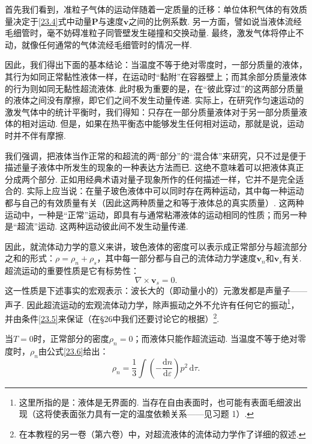 首先我们看到，准粒子气体的运动伴随着一定质量的迁移：单位体积气体的有效质量决定于\eqref{23.4}式中动量$\bm{P}$与速度$\bm{v}$之间的比例系数. 另一方面，譬如说当液体流经毛细管时，毫不妨碍准粒子同管壁发生碰撞和交换动量. 最终，激发气体将停止不动，就像任何通常的气体流经毛细管时的情况一样.

因此，我们得出下面的基本结论：当温度不等于绝对零度时，一部分质量的液体，其行为如同正常黏性液体一样，在运动时“黏附”在容器壁上；而其余部分质量液体的行为则如同无黏性超流液体. 此时极为重要的是，在“彼此穿过”的这两部分质量的液体之间没有摩擦，即它们之间不发生动量传递. 实际上，在研究作匀速运动的激发气体中的统计平衡时，我们得知：只存在一部分质量液体对于另一部分质量液体的相对运动. 但是，如果在热平衡态中能够发生任何相对运动，那就是说，运动时并不伴有摩擦.

我们强调，把液体当作正常的和超流的两“部分”的“混合体”来研究，只不过是便于描述量子液体中所发生的现象的一种表达方法而已. 这绝不意味着可以把液体真正分成两个部分. 正如用经典术语对量子现象所作的任何描述一样，它并不是完全适合的. 实际上应当说：在量子玻色液体中可以同时存在两种运动，其中每一种运动都与自己的有效质量有关（因此这两种质量之和等于液体总的真实质量）. 这两种运动中，一种是“正常”运动，即具有与通常粘滞液体的运动相同的性质；而另一种是“超流”运动. 这两种运动彼此间不发生动量传递.

因此，就流体动力学的意义来讲，玻色液体的密度可以表示成正常部分与超流部分之和的形式：$\rho=\rho_{n}+\rho_{s}$，其中每一部分都与自己的流体动力学速度$\bm{v}_{n}$和$\bm{v}_{s}$有关. 超流运动的重要性质是它有标势性：
\begin{equation}
\nabla\times\bm{v}_{s}=0.
\label{23.5}
\end{equation}
这一性质是下述事实的宏观表示：波长大的（即动量小的）元激发都是声量子——声子. 因此超流运动的宏观流体动力学，除声振动之外不允许有任何它的振动\footnote{这里所指的是：液体是无界面的. 当存在自由表面时，也可能有表面毛细波出现（这将使表面张力具有一定的温度依赖关系——见习题 1）.}，并由条件\eqref{23.5}来保证（在§26中我们还要讨论它的根据）\footnote{在本教程的另一卷（第六卷）中，对超流液体的流体动力学作了详细的叙述.}.

当$T=0$时，正常部分的密度$\rho_{n}=0$；而液体只能作超流运动. 当温度不等于绝对零度时，$\rho_{n}$由公式\eqref{23.6}给出：
\begin{equation}
\rho_{n}=\frac{1}{3}\int\left(-\frac{\mathrm{d}n}{\mathrm{d}\varepsilon}\right)p^{2}\,\mathrm{d}\tau.
\label{23.6}
\end{equation}

